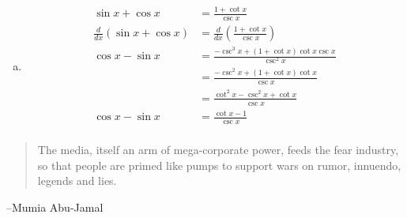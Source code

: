\documentclass[letterpaper, landscape]{exam}
\begin{document}
\begin{description}
\begin{enumerate}[(a)]
        \item
          \begin{align*}
            \sin x + \cos x                  & = \frac{1 + \cot x }{\csc x} \\
            \frac{d}{dx} ( \sin x + \cos x ) & = \frac{d}{dx} \left( \frac{1 + \cot x }{\csc x}  \right) \\
            \cos x - \sin x                  & = \frac{ - \csc^3 x + (1 + \cot x) \cot x \csc x }{\csc^2 x} \\
                                             & = \frac{ - \csc^2 x + (1 + \cot x) \cot x }{\csc x} \\
                                             & = \frac{ \cot^2 x - \csc^2 x + \cot x }{\csc x} \\
            \cos x - \sin x                  & = \frac{ \cot x - 1 }{\csc x} \\
          \end{align*}
      \end{enumerate}

  \end{description}

  \else
    \vspace{10 cm}
    \begin{quote}
      \begin{em}
        The media, itself an arm of mega-corporate power, feeds the fear industry, so that people
        are primed like pumps to support wars on rumor, innuendo, legends and lies.
      \end{em}
    \end{quote}
    \hspace{2 cm} --Mumia Abu-Jamal
  \fi
\end{document}
